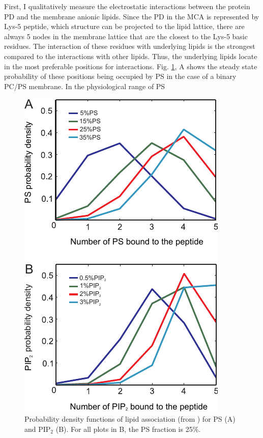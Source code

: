 First, I qualitatively measure the electrostatic interactions between the protein PD and the membrane anionic lipids. Since the PD in the MCA is represented by Lys-5 peptide, which structure can be projected to the lipid lattice, there are always 5 nodes in the membrane lattice that are the closest to the Lys-5 basic residues. The interaction of these residues with underlying lipids is the strongest compared to the interactions with other lipids. Thus, the underlying lipids locate in the most preferable positions for interactions. Fig. \ref{fig:occupation_probabilities}, A shows the steady state probability of these positions being occupied by PS in the case of a binary PC/PS membrane. In the physiological range of PS
\begin{figure}[!ht]
\begin{center}
  \includegraphics[scale=1.3]{../figures/occupation_probabilities.pdf}
\end{center}
 \caption[Probability density functions of lipid association for PS and PIP$_2$]{Probability density functions of lipid association (from \cite{Kiselev2011}) for PS (A) and PIP$_2$ (B). For all plots in B, the PS fraction is 25\%.}
\label{fig:occupation_probabilities}
\end{figure}
